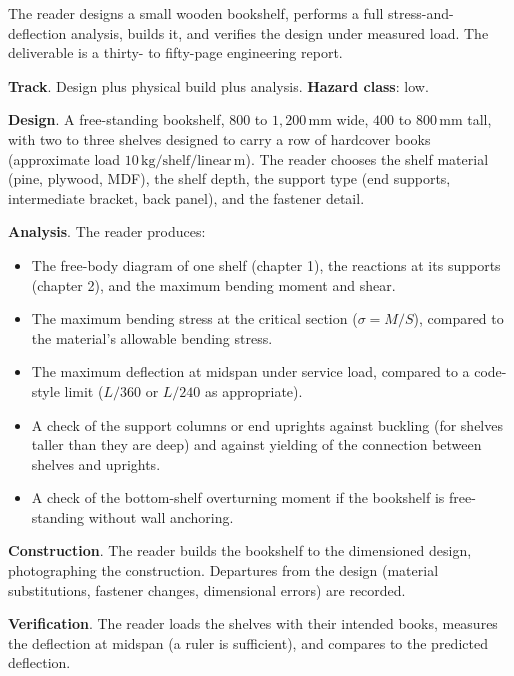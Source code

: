 \begin{project}
The reader designs a small wooden bookshelf, performs a full
stress-and-deflection analysis, builds it, and verifies the design
under measured load. The deliverable is a thirty- to fifty-page
engineering report.

\textbf{Track}. Design plus physical build plus analysis.
\textbf{Hazard class}: low.

\textbf{Design}. A free-standing bookshelf, $800$ to $1{,}200\,\si{
\milli\meter}$ wide, $400$ to $800\,\si{\milli\meter}$ tall, with
two to three shelves designed to carry a row of hardcover books
(approximate load $10\,\si{\kilogram}/\text{shelf}/\text{linear}\,
\si{\meter}$). The reader chooses the shelf material (pine,
plywood, MDF), the shelf depth, the support type (end supports,
intermediate bracket, back panel), and the fastener detail.

\textbf{Analysis}. The reader produces:

\begin{itemize}[leftmargin=*]
  \item The free-body diagram of one shelf (chapter 1), the
    reactions at its supports (chapter 2), and the maximum bending
    moment and shear.
  \item The maximum bending stress at the critical section ($\sigma
    = M/S$), compared to the material's allowable bending stress.
  \item The maximum deflection at midspan under service load,
    compared to a code-style limit ($L/360$ or $L/240$ as
    appropriate).
  \item A check of the support columns or end uprights against
    buckling (for shelves taller than they are deep) and against
    yielding of the connection between shelves and uprights.
  \item A check of the bottom-shelf overturning moment if the
    bookshelf is free-standing without wall anchoring.
\end{itemize}

\textbf{Construction}. The reader builds the bookshelf to the
dimensioned design, photographing the construction. Departures from
the design (material substitutions, fastener changes, dimensional
errors) are recorded.

\textbf{Verification}. The reader loads the shelves with their
intended books, measures the deflection at midspan (a ruler is
sufficient), and compares to the predicted deflection.


\end{project}
